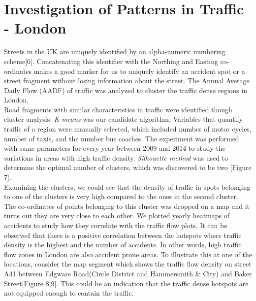 \documentclass{neu_handout}
\begin{document}
\section{Investigation of Patterns in Traffic - London}
Streets in the UK are uniquely identified by an alpha-numeric numbering scheme[6]. Concatenating this identifier with the Northing and Easting co-ordinates makes a good marker for us to uniquely identify an accident spot or a street fragment without losing information about the street. The Annual Average Daily Flow (AADF) of traffic was analyzed to cluster the traffic dense regions in London. \\

Road fragments with similar characteristics in traffic were identified though cluster analysis.
\textit{K-means} was our candidate algorithm. Variables that quantify traffic of a region were manually selected, which included number of motor cycles, number of taxis, and the number bus coaches. The  experiment was performed with same parameters for every year between 2009 and 2014 to study the variations in areas with high traffic density. \textit{Silhouette method} was used to determine the optimal number of clusters, which was discovered to be two [Figure 7].\\

Examining the clusters, we could see that the density of traffic in spots belonging to one of the clusters is very high compared to the ones in the second cluster. The co-ordinates of points belonging to this cluster was dropped on a map and it turns out they are very close to each other. We plotted yearly heatmaps of accidents to study how they correlate with the traffic flow plots. It can be observed that there is a positive correlation between the hotspots where traffic density is the highest and the number of accidents. In other words, high traffic flow zones in London are also accident prone areas. To illustrate this at one of the locations, consider the map segment which shows the traffic flow density on street A41 between Edgware Road(Circle District and Hammersmith \& City) and Baker Street[Figure 8,9]. This could be an indication that the traffic dense hotspots are not equipped enough to contain the traffic. \\
\end{document}
